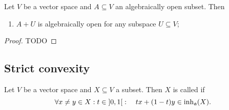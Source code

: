 \begin{proposition} \label{algebraicallyOpen}
Let $V$ be a vector space and $A \subseteq V$ an algebraically open subset. Then
\begin{enumerate}
\item $A+U$ is algebraically open for any subspace $U\subseteq V$;
\end{enumerate}
\end{proposition}
\begin{proof}
TODO
\end{proof}

\subsection{Strict convexity}
\begin{definition}
Let $V$ be a vector space and $X\subseteq V$ a subset. Then $X$ is called  if
\[ \forall x\neq y \in X: t\in\interval[o]{0,1}: \quad tx + (1-t)y\in \inh_\mathfrak{a}(X). \]
\end{definition}


